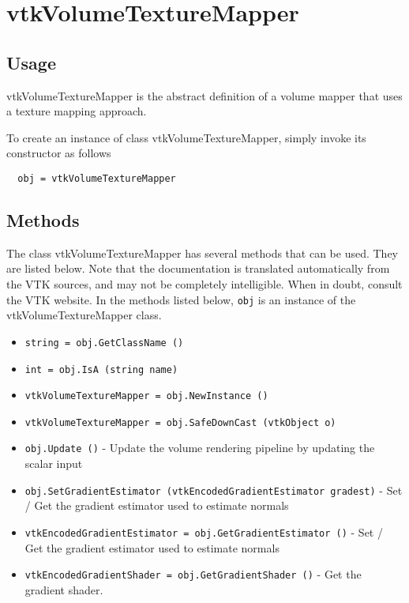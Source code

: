 \section{vtkVolumeTextureMapper}

\subsection{Usage}

 vtkVolumeTextureMapper is the abstract definition of a volume mapper
 that uses a texture mapping approach.

To create an instance of class vtkVolumeTextureMapper, simply
invoke its constructor as follows
\begin{verbatim}
  obj = vtkVolumeTextureMapper
\end{verbatim}
\subsection{Methods}

The class vtkVolumeTextureMapper has several methods that can be used.
  They are listed below.
Note that the documentation is translated automatically from the VTK sources,
and may not be completely intelligible.  When in doubt, consult the VTK website.
In the methods listed below, \verb|obj| is an instance of the vtkVolumeTextureMapper class.
\begin{itemize}
\item  \verb|string = obj.GetClassName ()|

\item  \verb|int = obj.IsA (string name)|

\item  \verb|vtkVolumeTextureMapper = obj.NewInstance ()|

\item  \verb|vtkVolumeTextureMapper = obj.SafeDownCast (vtkObject o)|

\item  \verb|obj.Update ()| -  Update the volume rendering pipeline by updating the scalar input

\item  \verb|obj.SetGradientEstimator (vtkEncodedGradientEstimator gradest)| -  Set / Get the gradient estimator used to estimate normals

\item  \verb|vtkEncodedGradientEstimator = obj.GetGradientEstimator ()| -  Set / Get the gradient estimator used to estimate normals

\item  \verb|vtkEncodedGradientShader = obj.GetGradientShader ()| -  Get the gradient shader.

\end{itemize}
